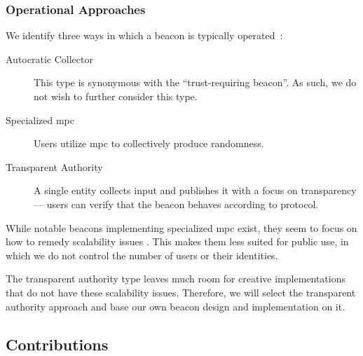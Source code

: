 \subsubsection{Operational Approaches}
We identify three ways in which a beacon is typically operated~:

\begin{description}
    \item[Autocratic Collector] This type is synonymous with the \enquote{trust-requiring beacon}. As such, we do not wish to further consider this type.

    \item [Specialized \acrshort{mpc}] Users utilize \acrfull{mpc} to collectively produce randomness.

    \item [Transparent Authority] A single entity collects input and publishes it with a focus on transparency --- users can verify that the beacon behaves according to protocol.

\end{description}

While notable beacons implementing specialized \acrshort{mpc} exist, they seem to focus on how to remedy scalability issues . This makes them less suited for public use, in which we do not control the number of users or their identities.

The transparent authority type leaves much room for creative implementations that do not have these scalability issues. Therefore, we will select the transparent authority approach and base our own beacon design and implementation on it.

\subsection{Contributions}
